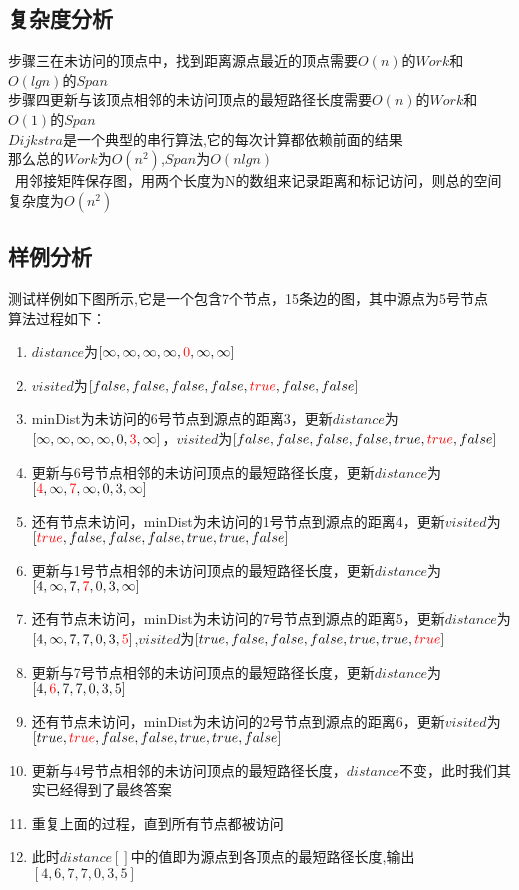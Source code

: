 \documentclass[UTF8,a4paperdui, %
]{ctexart}
\begin{document}
\subsection{复杂度分析}
步骤三在未访问的顶点中，找到距离源点最近的顶点需要$O(n)$的$Work$和$O(lgn)$的$Span$\\
步骤四更新与该顶点相邻的未访问顶点的最短路径长度需要$O(n)$的$Work$和$O(1)$的$Span$\\
$Dijkstra$是一个典型的串行算法,它的每次计算都依赖前面的结果\\
那么总的$Work$为$O(n^2)$,$Span$为$O(nlgn)$\\\
用邻接矩阵保存图，用两个长度为N的数组来记录距离和标记访问，则总的空间复杂度为$O(n^2)$
\subsection{样例分析}
测试样例如下图所示,它是一个包含7个节点，15条边的图，其中源点为5号节点\\
算法过程如下：
\begin{enumerate}
    \item $distance$为$[\infty,\infty,\infty,\infty,\textcolor{red}{0},\infty,\infty]$
    \item $visited$为$[false,false,false,false,\textcolor{red}{true},false,false]$
    \item minDist为未访问的6号节点到源点的距离3，更新$distance$为$[\infty,\infty,\infty,\infty,0,\textcolor{red}{3},\infty]$，$visited$为$[false,false,false,false,true,\textcolor{red}{true},false]$
    \item 更新与6号节点相邻的未访问顶点的最短路径长度，更新$distance$为$[\textcolor{red}{4},\infty,\textcolor{red}{7},\infty,0,3,\infty]$
    \item 还有节点未访问，minDist为未访问的1号节点到源点的距离4，更新$visited$为$[\textcolor{red}{true},false,false,false,true,true,false]$
    \item 更新与1号节点相邻的未访问顶点的最短路径长度，更新$distance$为$[4,\infty,7,\textcolor{red}{7},0,3,\infty]$
    \item 还有节点未访问，minDist为未访问的7号节点到源点的距离5，更新$distance$为$[4,\infty,7,7,0,3,\textcolor{red}{5}]$,$visited$为$[true,false,false,false,true,true,\textcolor{red}{true}]$
    \item 更新与7号节点相邻的未访问顶点的最短路径长度，更新$distance$为$[4,\textcolor{red}{6},7,7,0,3,5]$
    \item 还有节点未访问，minDist为未访问的2号节点到源点的距离6，更新$visited$为$[true,\textcolor{red}{true},false,false,true,true,false]$
    \item 更新与4号节点相邻的未访问顶点的最短路径长度，$distance$不变，此时我们其实已经得到了最终答案
    \item 重复上面的过程，直到所有节点都被访问
    \item 此时$distance[]$中的值即为源点到各顶点的最短路径长度,输出$[4,6,7,7,0,3,5]$
\end{enumerate}
\end{document}

